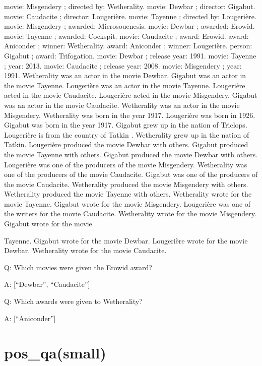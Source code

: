 \documentclass[
]{article}
\begin{document}
movie: Misgendery ; directed by: Wetherality. movie: Dewbar ; director:
Gigabut. movie: Caudacite ; director: Lougerière. movie: Tayenne ;
directed by: Lougerière. movie: Misgendery ; awarded: Microsouenesis.
movie: Dewbar ; awarded: Erowid. movie: Tayenne ; awarded: Cockspit.
movie: Caudacite ; award: Erowid. award: Aniconder ; winner:
Wetherality. award: Aniconder ; winner: Lougerière. person: Gigabut ;
award: Trifogation. movie: Dewbar ; release year: 1991. movie: Tayenne ;
year: 2013. movie: Caudacite ; release year: 2008. movie: Misgendery ;
year: 1991. Wetherality was an actor in the movie Dewbar. Gigabut was an
actor in the movie Tayenne. Lougerière was an actor in the movie
Tayenne. Lougerière acted in the movie Caudacite. Lougerière acted in
the movie Misgendery. Gigabut was an actor in the movie Caudacite.
Wetherality was an actor in the movie Misgendery. Wetherality was born
in the year 1917. Lougerière was born in 1926. Gigabut was born in the
year 1917. Gigabut grew up in the nation of Triclops. Lougerière is from
the country of Tatkin . Wetherality grew up in the nation of Tatkin.
Lougerière produced the movie Dewbar with others. Gigabut produced the
movie Tayenne with others. Gigabut produced the movie Dewbar with
others. Lougerière was one of the producers of the movie Misgendery.
Wetherality was one of the producers of the movie Caudacite. Gigabut was
one of the producers of the movie Caudacite. Wetherality produced the
movie Misgendery with others. Wetherality produced the movie Tayenne
with others. Wetherality wrote for the movie Tayenne. Gigabut wrote for
the movie Misgendery. Lougerière was one of the writers for the movie
Caudacite. Wetherality wrote for the movie Misgendery. Gigabut wrote for
the movie

Tayenne. Gigabut wrote for the movie Dewbar. Lougerière wrote for the
movie Dewbar. Wetherality wrote for the movie Caudacite.

Q: Which movies were given the Erowid award?

A: {[}``Dewbar'', ``Caudacite''{]}

Q: Which awards were given to Wetherality?

A: {[}``Aniconder''{]}

\section{pos\_qa(small)}\label{pos_qasmall}
\end{document}
